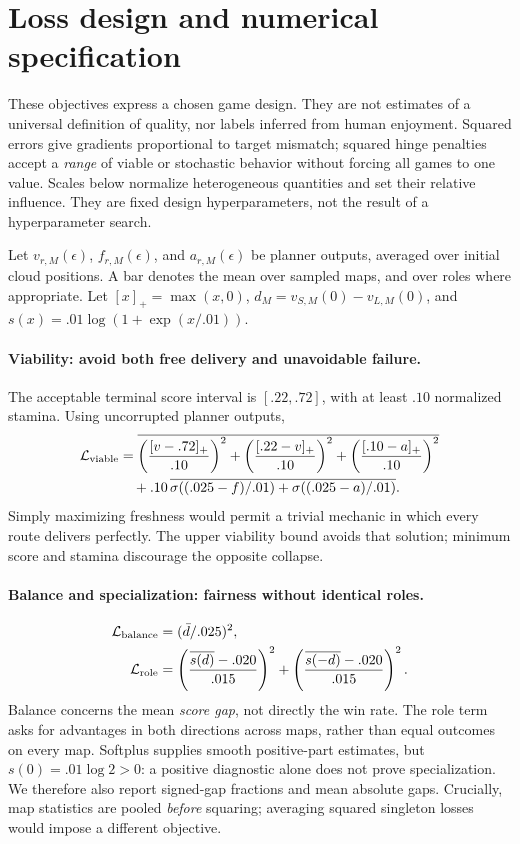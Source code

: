 \section{Loss design and numerical specification}
\label{app:loss}

These objectives express a chosen game design. They are not estimates of a
universal definition of quality, nor labels inferred from human enjoyment.
Squared errors give gradients proportional to target mismatch; squared hinge
penalties accept a \emph{range} of viable or stochastic behavior without forcing
all games to one value. Scales below normalize heterogeneous quantities and set
their relative influence. They are fixed design hyperparameters, not the result
of a hyperparameter search.

Let $v_{r,M}(\epsilon)$, $f_{r,M}(\epsilon)$, and $a_{r,M}(\epsilon)$ be planner
outputs, averaged over initial cloud positions. A bar denotes the mean over
sampled maps, and over roles where appropriate. Let $[x]_+=\max(x,0)$,
$d_M=v_{S,M}(0)-v_{L,M}(0)$, and $s(x)=.01\log(1+\exp(x/.01))$.

\paragraph{Viability: avoid both free delivery and unavoidable failure.}
The acceptable terminal score interval is $[.22,.72]$, with at least $.10$
normalized stamina. Using uncorrupted planner outputs,
\begin{align}
 \mathcal L_{\rm viable}
 &=\overline{\left(\frac{[v-.72]_+}{.10}\right)^2
 +\left(\frac{[.22-v]_+}{.10}\right)^2
 +\left(\frac{[.10-a]_+}{.10}\right)^2}\\
 &\quad+.10\,\overline{\sigma((.025-f)/.01)+\sigma((.025-a)/.01)}.
\end{align}
Simply maximizing freshness would permit a trivial mechanic in which every
route delivers perfectly. The upper viability bound avoids that solution;
minimum score and stamina discourage the opposite collapse.

\paragraph{Balance and specialization: fairness without identical roles.}
\begin{align}
 \mathcal L_{\rm balance}&=(\bar d/.025)^2,\\
 \mathcal L_{\rm role}
 &=\left(\frac{\overline{s(d)}-.020}{.015}\right)^2
 +\left(\frac{\overline{s(-d)}-.020}{.015}\right)^2.
\end{align}
Balance concerns the mean \emph{score gap}, not directly the win rate. The role
term asks for advantages in both directions across maps, rather than equal
outcomes on every map. Softplus supplies smooth positive-part estimates, but
$s(0)=.01\log2>0$: a positive diagnostic alone does not prove specialization.
We therefore also report signed-gap fractions and mean absolute gaps. Crucially,
map statistics are pooled \emph{before} squaring; averaging squared singleton
losses would impose a different objective.

